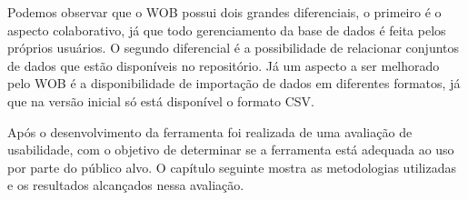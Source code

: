 Podemos observar que o WOB possui dois grandes diferenciais, o primeiro é o aspecto colaborativo,
já que todo gerenciamento da base de dados é feita pelos próprios usuários. O segundo diferencial
é a possibilidade de relacionar conjuntos de dados que estão disponíveis no repositório. 
Já um aspecto a ser melhorado pelo WOB é a disponibilidade de importação de dados em 
diferentes formatos, já que na versão inicial só está disponível o formato CSV.

Após o desenvolvimento da ferramenta foi realizada de uma avaliação de usabilidade,
com o objetivo de determinar se a ferramenta está adequada ao uso por parte do público alvo.
O capítulo seguinte mostra as metodologias utilizadas e os resultados alcançados nessa avaliação.
